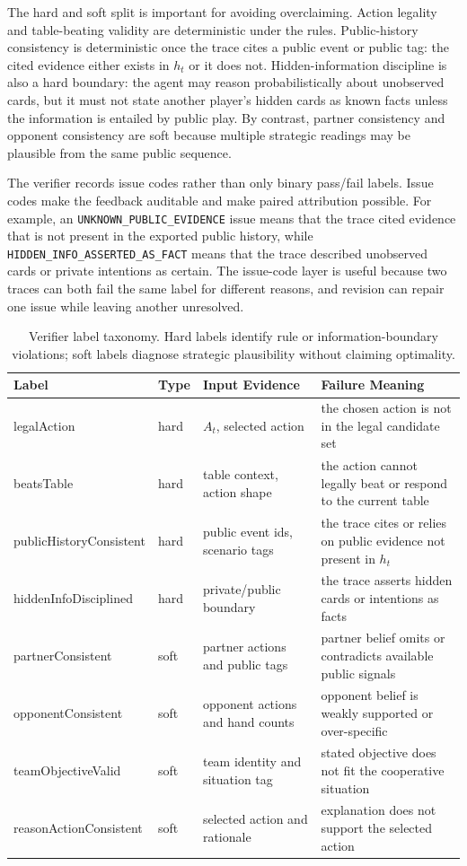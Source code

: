 \documentclass[sigconf,anonymous,review]{acmart}
\begin{document}
The hard and soft split is important for avoiding overclaiming. Action legality and table-beating validity are deterministic under the rules. Public-history consistency is deterministic once the trace cites a public event or public tag: the cited evidence either exists in \(h_t\) or it does not. Hidden-information discipline is also a hard boundary: the agent may reason probabilistically about unobserved cards, but it must not state another player's hidden cards as known facts unless the information is entailed by public play. By contrast, partner consistency and opponent consistency are soft because multiple strategic readings may be plausible from the same public sequence.

The verifier records issue codes rather than only binary pass/fail labels. Issue codes make the feedback auditable and make paired attribution possible. For example, an \texttt{UNKNOWN\_PUBLIC\_EVIDENCE} issue means that the trace cited evidence that is not present in the exported public history, while \texttt{HIDDEN\_INFO\_ASSERTED\_AS\_FACT} means that the trace described unobserved cards or private intentions as certain. The issue-code layer is useful because two traces can both fail the same label for different reasons, and revision can repair one issue while leaving another unresolved.

\begin{table}[t]
\centering
\caption{Verifier label taxonomy. Hard labels identify rule or information-boundary violations; soft labels diagnose strategic plausibility without claiming optimality.}
\label{tab:label-taxonomy}
\small
\begin{tabularx}{\textwidth}{lllX}
\toprule
Label & Type & Input Evidence & Failure Meaning \\
\midrule
legalAction & hard & \(A_t\), selected action & the chosen action is not in the legal candidate set \\
beatsTable & hard & table context, action shape & the action cannot legally beat or respond to the current table \\
publicHistoryConsistent & hard & public event ids, scenario tags & the trace cites or relies on public evidence not present in \(h_t\) \\
hiddenInfoDisciplined & hard & private/public boundary & the trace asserts hidden cards or intentions as facts \\
partnerConsistent & soft & partner actions and public tags & partner belief omits or contradicts available public signals \\
opponentConsistent & soft & opponent actions and hand counts & opponent belief is weakly supported or over-specific \\
teamObjectiveValid & soft & team identity and situation tag & stated objective does not fit the cooperative situation \\
reasonActionConsistent & soft & selected action and rationale & explanation does not support the selected action \\
\bottomrule
\end{tabularx}
\end{table}
\end{document}
